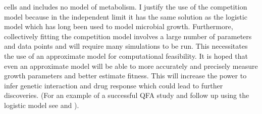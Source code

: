 cells and includes no model of metabolism. I justify the use of the
competition model because in the independent limit it has the same
solution as the logistic model which has long been used to model
microbial growth. Furthermore, collectively fitting the competition
model involves a large number of parameters and data points and will
require many simulations to be run. This necessitates the use of an
approximate model for computational feasibility. It is hoped that even
an approximate model will be able to more accurately and precisely
measure growth parameters and better estimate fitness. This will
increase the power to infer genetic interaction and drug response
which could lead to further discoveries. (For an example of a
successful QFA study and follow up using the logistic model see
\citet{Addinall2011} and \citet{Holstein20141259}).



